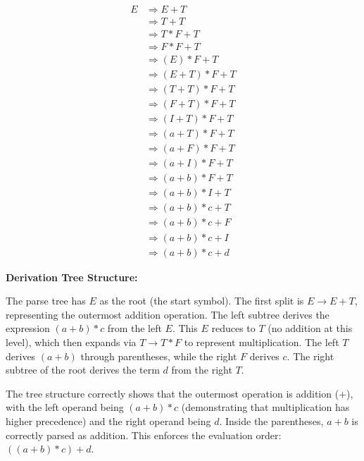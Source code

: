 \documentclass[12pt]{article}
\begin{document}
$$\begin{aligned}
E &\Rightarrow E+T \\
&\Rightarrow T+T \\
&\Rightarrow T*F+T \\
&\Rightarrow F*F+T \\
&\Rightarrow (E)*F+T \\
&\Rightarrow (E+T)*F+T \\
&\Rightarrow (T+T)*F+T \\
&\Rightarrow (F+T)*F+T \\
&\Rightarrow (I+T)*F+T \\
&\Rightarrow (a+T)*F+T \\
&\Rightarrow (a+F)*F+T \\
&\Rightarrow (a+I)*F+T \\
&\Rightarrow (a+b)*F+T \\
&\Rightarrow (a+b)*I+T \\
&\Rightarrow (a+b)*c+T \\
&\Rightarrow (a+b)*c+F \\
&\Rightarrow (a+b)*c+I \\
&\Rightarrow (a+b)*c+d
\end{aligned}$$

\textbf{Derivation Tree Structure:}

The parse tree has $E$ as the root (the start symbol). The first split is $E \rightarrow E+T$, representing the outermost addition operation. The left subtree derives the expression $(a+b)*c$ from the left $E$. This $E$ reduces to $T$ (no addition at this level), which then expands via $T \rightarrow T*F$ to represent multiplication. The left $T$ derives $(a+b)$ through parentheses, while the right $F$ derives $c$. The right subtree of the root derives the term $d$ from the right $T$.

The tree structure correctly shows that the outermost operation is addition ($+$), with the left operand being $(a+b)*c$ (demonstrating that multiplication has higher precedence) and the right operand being $d$. Inside the parentheses, $a+b$ is correctly parsed as addition. This enforces the evaluation order: $((a+b)*c)+d$.
\end{document}
